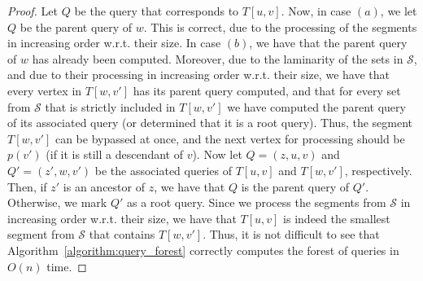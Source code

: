 \documentclass[11pt,a4paper]{article}
\begin{document}
\begin{proof}
Let $Q$ be the query that corresponds to $T[u,v]$. Now, in case $(a)$, we let $Q$ be the parent query of $w$. This is correct, due to the processing of the segments in increasing order w.r.t. their size. In case $(b)$, we have that the parent query of $w$ has already been computed. Moreover, due to the laminarity of the sets in $\mathcal{S}$, and due to their processing in increasing order w.r.t. their size, we have that every vertex in $T[w,v']$ has its parent query computed, and that for every set from $\mathcal{S}$ that is strictly included in $T[w,v']$ we have computed the parent query of its associated query (or determined that it is a root query). Thus, the segment $T[w,v']$ can be bypassed at once, and the next vertex for processing should be $p(v')$ (if it is still a descendant of $v$). Now let $Q=(z,u,v)$ and $Q'=(z',w,v')$ be the associated queries of $T[u,v]$ and $T[w,v']$, respectively. Then, if $z'$ is an ancestor of $z$, we have that $Q$ is the parent query of $Q'$. Otherwise, we mark $Q'$ as a root query. Since we process the segments from $\mathcal{S}$ in increasing order w.r.t. their size, we have that $T[u,v]$ is indeed the smallest segment from $\mathcal{S}$ that contains $T[w,v']$. Thus, it is not difficult to see that Algorithm~\ref{algorithm:query_forest} correctly computes the forest of queries in $O(n)$ time.
\end{proof} 
\end{document}
